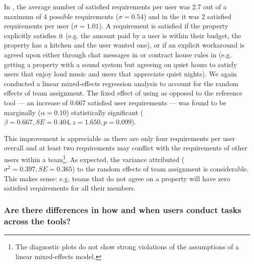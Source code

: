 In \tool, the average number of satisfied requirements per user was 2.7 out of a maximum of 4 possible requirements ($\sigma = 0.54$) and in the \baseline it was 2 satisfied requirements per user ($\sigma = 1.01$). A requirement is satisfied if the property explicitly satisfies it (e.g. the amount paid by a user is within their budget, the property has a kitchen and the user wanted one), or if an explicit workaround is agreed upon either through chat messages in \baseline or contract house rules in \tool (e.g. getting a property with a sound system but agreeing on quiet hours to satisfy users that enjoy loud music and users that appreciate quiet nights). We again conducted a linear mixed-effects regression analysis to account for the random effects of team assignment. The fixed effect of using \tool as opposed to the reference \baseline tool --- an increase of 0.667 satisfied user requirements --- was found to be marginally ($\alpha = 0.10$) statistically significant ($\beta = 0.667, SE = 0.404, z = 1.650, p = 0.099$).  

This improvement is appreciable as there are only four requirements per user overall and at least two requirements may conflict with the requirements of other users within a team\footnote{The diagnostic plots do not show strong violations of the assumptions of a linear mixed-effects model.}. As expected, the variance attributed ($\sigma^2 = 0.397, SE = 0.365$) to the random effects of team assignment is considerable. This makes sense: e.g. teams that do not agree on a property will have zero satisfied requirements for all their members. 


\subsubsection{Are there differences in how and when users conduct tasks across the tools?\\}

